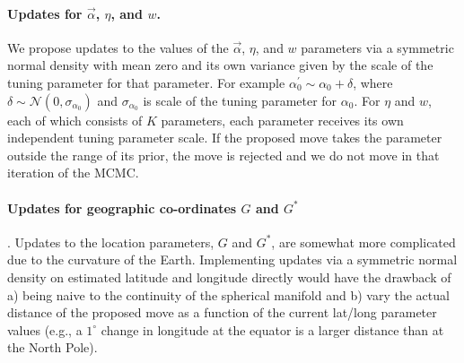 \documentclass[12pt]{article}
\newcommand{\identifyadmixsource}[1]{{#1^{*}}}
\begin{document}
\paragraph{Updates for $\vec{\alpha}$, $\eta$, and $w$.}
We propose updates to the values of the $\vec{\alpha}$, $\eta$, and $w$ parameters via a symmetric normal density with mean zero and its own variance given by the scale of the tuning parameter for that parameter.  For example $\alpha_0^{\prime} \sim \alpha_0 + \delta$, where $\delta \sim \mathcal{N}(0,\sigma_{\alpha_0})$ and $\sigma_{\alpha_0}$ is scale of the tuning parameter for $\alpha_0$.  For $\eta$ and $w$, each of which consists of $K$ parameters, each parameter receives its own independent tuning parameter scale. If the proposed move takes the parameter outside the range of its prior, the move is rejected and we do not move in that iteration of the MCMC.

\paragraph{Updates for geographic co-ordinates $G$ and $\identifyadmixsource{G}$}. Updates to the location parameters, $G$ and $\identifyadmixsource{G}$, are somewhat more complicated due to the curvature of the Earth.  Implementing updates via a symmetric normal density on estimated latitude and longitude directly would have the drawback of a) being naive to the continuity of the spherical manifold and b) vary the actual distance of the proposed move as a function of the current lat/long parameter values (e.g., a $1^{\circ}$ change in longitude at the equator is a larger distance than at the North Pole).  
\end{document}
